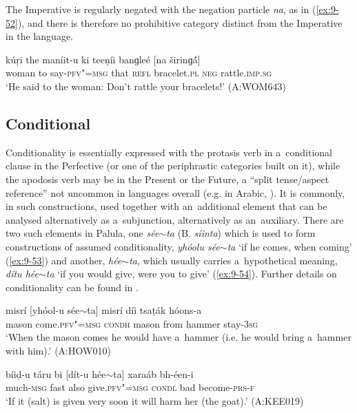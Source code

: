 The Imperative is regularly negated with the negation particle \textit{na}, as in (\ref{ex:9-52}), and there is therefore no prohibitive category distinct from the Imperative in the language.

\begin{exe}
\ex{}
\label{ex:9-52}
\gll kúṛi the maníit-u ki teeṇíi banɡleé [na širinɡ\'{á}] \\
woman to say-\textsc{pfv"=msg} that \textsc{refl} bracelet.\textsc{pl} \textsc{neg} rattle.\textsc{imp.sg} \\
\glt `He said to the woman: Don't rattle your bracelets!' (A:WOM643)
\end{exe}

\subsection{Conditional}
\label{subsec:9-2-2}

Conditionality is essentially expressed with the protasis verb in a~conditional clause in the Perfective (or one of the periphrastic categories built on it), while the apodosis verb may be in the Present or the Future, a ``split tense/aspect reference'' not uncommon in languages overall (e.g. in Arabic, \citealt[80]{dahl1985}). It is commonly, in such constructions, used together with an~additional element that can be analysed alternatively as a~subjunction, alternatively as an~auxiliary. There are two such elements in Palula, one \textit{sée$\sim$ta} (B. \textit{síinta}) which is used to form constructions of assumed conditionality, \textit{yhóolu sée$\sim$ta} `if he comes, when coming' (\ref{ex:9-53}) and another, \textit{hée$\sim$ta}, which usually carries a~hypothetical meaning, \textit{dítu hée$\sim$ta} `if you would give, were you to give' (\ref{ex:9-54}). Further details on conditionality can be found in . 

\begin{exe}
\ex
\label{ex:9-53}
\gll misrí [yhóol-u sée$\sim$ta] misrí díi tsaṭák hóons-a \\
mason come.\textsc{pfv"=msg} \textsc{condh} mason from hammer stay-\textsc{3sg} \\
\glt `When the mason comes he would have a~hammer (i.e. he would bring a~hammer with him).' (A:HOW010)

\ex
\label{ex:9-54}
\gll bíiḍ-u táru bi [dít-u hée$\sim$ta] xaraáb bh-éen-i \\
much-\textsc{msg} fast also give.\textsc{pfv"=msg} \textsc{condl} bad become-\textsc{prs-f} \\
\glt `If it (salt) is given very soon it will harm her (the goat).' (A:KEE019)
\end{exe}

